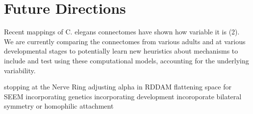 \section{Future Directions}

Recent mappings of C. elegans connectomes have shown how variable it is (2). We are currently comparing the connectomes from various adults and at various developmental stages to potentially learn new heuristics about mechanisms to include and test using these computational models, accounting for the underlying variability. 

stopping at the Nerve Ring
adjusting alpha in RDDAM
flattening space for SEEM
incorporating genetics
incorporating development
incoroporate bilateral symmetry or homophilic attachment
